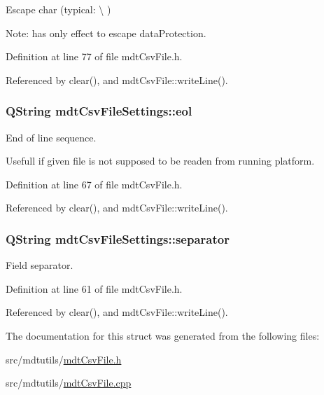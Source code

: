 Escape char (typical\-: \textbackslash{} ) 

Note\-: has only effect to escape data\-Protection. 

Definition at line 77 of file mdt\-Csv\-File.\-h.



Referenced by clear(), and mdt\-Csv\-File\-::write\-Line().

\hypertarget{structmdt_csv_file_settings_a559c7042e3eaf2880cb131f627298f81}{
\subsubsection[{eol}]{\setlength{\rightskip}{0pt plus 5cm}Q\-String mdt\-Csv\-File\-Settings\-::eol}}\label{structmdt_csv_file_settings_a559c7042e3eaf2880cb131f627298f81}


End of line sequence. 

Usefull if given file is not supposed to be readen from running platform. 

Definition at line 67 of file mdt\-Csv\-File.\-h.



Referenced by clear(), and mdt\-Csv\-File\-::write\-Line().

\hypertarget{structmdt_csv_file_settings_a61eb8e3d43d37e9a21a8ff5aec619cf9}{
\subsubsection[{separator}]{\setlength{\rightskip}{0pt plus 5cm}Q\-String mdt\-Csv\-File\-Settings\-::separator}}\label{structmdt_csv_file_settings_a61eb8e3d43d37e9a21a8ff5aec619cf9}


Field separator. 



Definition at line 61 of file mdt\-Csv\-File.\-h.



Referenced by clear(), and mdt\-Csv\-File\-::write\-Line().



The documentation for this struct was generated from the following files\-:\begin{DoxyCompactItemize}
\item 
src/mdtutils/\hyperlink{mdt_csv_file_8h}{mdt\-Csv\-File.\-h}\item 
src/mdtutils/\hyperlink{mdt_csv_file_8cpp}{mdt\-Csv\-File.\-cpp}\end{DoxyCompactItemize}
